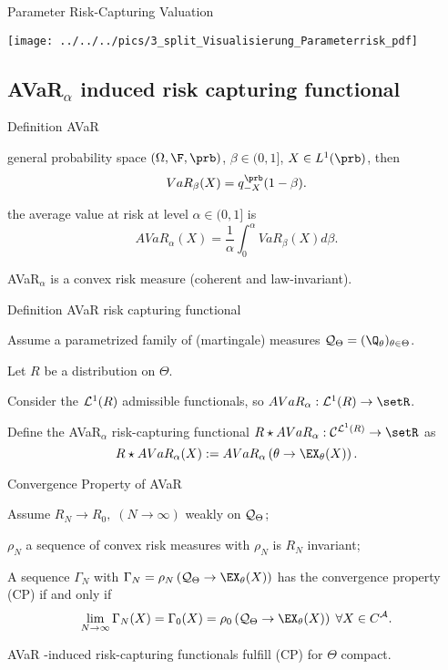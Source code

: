 {Parameter Risk-Capturing Valuation}
\begin{center}
\texttt{[image: ../../../pics/3\_split\_Visualisierung\_Parameterrisk\_pdf]}
\end{center}

\subsection{AVaR$_\alpha$ induced risk capturing functional}

{Definition AVaR}
\item general probability space $(\Omega, \F, \prb)$, $\beta \in (0,1]$, $X\in L^1(\prb)$, then
$$
VaR_\beta(X) = q_{-X}^{\prb}(1-\beta).
$$
\item the average value at risk at level $\alpha \in (0,1]$ is
$$
AVaR_\alpha(X) = \frac{1}{\alpha} \int_0^\alpha VaR_\beta(X) d\beta.
$$
\item AVaR$_\alpha$ is a convex risk measure (coherent and law-invariant).

{Definition AVaR risk capturing functional}
\item Assume a  parametrized family of (martingale) measures ${\cal Q}_\Theta = (\Q_\theta)_{\theta \in \Theta}$.
\item Let $R$ be a distribution on $\Theta$.
\item Consider the ${\cal L}^1(R)$ admissible functionals, so $AVaR_\alpha:  {\cal L}^1(R) \rightarrow \setR$.
\item Define the AVaR$_\alpha$ risk-capturing functional
$
R \star AVaR_\alpha: {\cal C}^{{\cal L}^1(R)}\rightarrow \setR
$
as
$$
R \star AVaR_\alpha(X) := AVaR_\alpha\left(\theta \rightarrow \EX_\theta(X) \right).
$$

{Convergence Property of AVaR}
\item Assume $R_N \rightarrow R_0, \; (N\rightarrow \infty) $ weakly on ${\cal Q}_\Theta$;
\item $\rho_N$ a sequence of convex risk measures with $\rho_N$ is $R_N$ invariant;
\item A sequence $\Gamma_N$ with $\Gamma_N= \rho_N\left({\cal Q}_\Theta \rightarrow \EX_\theta(X) \right)$ has the convergence property (CP) if and only if
$$
\lim_{N \rightarrow \infty} \Gamma_N(X) = \Gamma_0(X) = \rho_0 \left({\cal Q}_\Theta \rightarrow \EX_\theta(X) \right) \; \forall X \in C^{\cal A}.
$$
\item AVaR -induced risk-capturing functionals fulfill (CP) for $\Theta$ compact.

